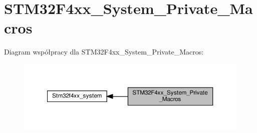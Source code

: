 \hypertarget{group___s_t_m32_f4xx___system___private___macros}{}\section{S\+T\+M32\+F4xx\+\_\+\+System\+\_\+\+Private\+\_\+\+Macros}
\label{group___s_t_m32_f4xx___system___private___macros}
Diagram współpracy dla S\+T\+M32\+F4xx\+\_\+\+System\+\_\+\+Private\+\_\+\+Macros\+:\nopagebreak
\begin{figure}[H]
\begin{center}
\leavevmode
\includegraphics[width=350pt]{group___s_t_m32_f4xx___system___private___macros}
\end{center}
\end{figure}
